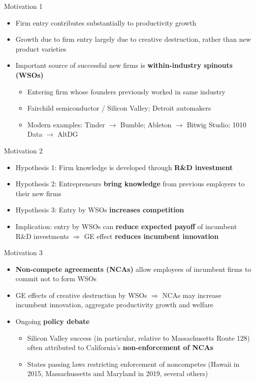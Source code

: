\documentclass[english,usenames,dvipsnames]{beamer}
\begin{document}
\begin{frame}{Motivation 1}
\begin{itemize}
	\item Firm entry contributes substantially to productivity growth
	\item Growth due to firm entry largely due to creative destruction, rather than new product varieties
	\item Important source of successful new firms is \alert{\textbf{within-industry spinouts (WSOs)}}
	\begin{itemize}
		\item Entering firm whose founders previously worked in same industry 
		\hyperlink{spinouts_facts_from_literature}{}
		\item Fairchild semiconductor / Silicon Valley; Detroit automakers \hyperlink{fairchildren_early}{}
		\item Modern examples: Tinder $\rightarrow$ Bumble; Ableton $\rightarrow$ Bitwig Studio; 1010 Data $\rightarrow$ AltDG 
	\end{itemize}
\end{itemize}
\end{frame}

\begin{frame}{Motivation 2}
\begin{itemize}
	\item Hypothesis 1: Firm knowledge is developed through \alert{\textbf{R\&D investment}}
	\item Hypothesis 2: Entrepreneurs \alert{\textbf{\textbf{bring knowledge}}}  from previous employers to their new firms
	\item Hypothesis 3: Entry by WSOs \alert{\textbf{increases competition}}
	\item Implication: entry by WSOs can \alert{\textbf{reduce expected payoff}} of incumbent R\&D investments $\Rightarrow$ GE effect \alert{\textbf{reduces incumbent innovation}}
\end{itemize}
\end{frame}

\begin{frame}{Motivation 3}
\begin{itemize}
	\item \alert{\textbf{Non-compete agreements (NCAs)}} allow employees of incumbent firms to commit not to form WSOs
	\item GE effects of creative destruction by WSOs $\Rightarrow$ NCAs may increase incumbent innovation, aggregate productivity growth and welfare
	\item Ongoing \alert{\textbf{policy debate}}
	\begin{itemize}
		\item Silicon Valley success (in particular, relative to Massachusetts Route 128) often attributed to California's \alert{\textbf{non-enforcement of NCAs}}
		\item States passing laws restricting enforcement of noncompetes (Hawaii in 2015, Massachussetts and Maryland in 2019, several others)
	\end{itemize}
\end{itemize}
\end{frame}
\end{document}
